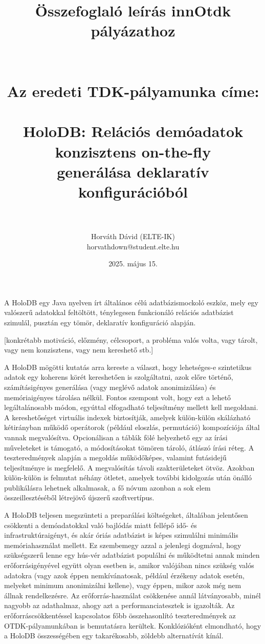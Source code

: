 \documentclass[12pt]{article}
\title{Összefoglaló leírás innOtdk pályázathoz \\ ~ \\ ~ \\ {\Large Az eredeti TDK-pályamunka címe: \\ ~ \\ HoloDB: Relációs demóadatok konzisztens on-the-fly \\ generálása deklaratív konfigurációból} \\ ~}
\author{Horváth Dávid (ELTE-IK) \\ horvathdown@student.elte.hu}
\date{2025. május 15.}
\begin{document}
\begin{titlepage}
\maketitle
\thispagestyle{empty}
\end{titlepage}

\cleardoublepage

A HoloDB egy Java nyelven írt általános célú adatbázismockoló eszköz, mely egy valószerű adatokkal feltöltött, ténylegesen funkcionáló relációs adatbázist szimulál, pusztán egy tömör, deklaratív konfiguráció alapján.

[konkrétabb motiváció, előzmény, célcsoport, a probléma valós volta, vagy tárolt, vagy nem konzisztens, vagy nem kereshető stb.]

A HoloDB mögötti kutatás arra kereste a választ, hogy lehetséges-e szintetikus adatok egy koherens körét kereshetően is szolgáltatni, azok előre történő, számításigényes generálása (vagy meglévő adatok anonimizálása) és memóriaigényes tárolása nélkül. Fontos szempont volt, hogy ezt a lehető legáltalánosabb módon, egyúttal elfogadható teljesítmény mellett kell megoldani.
A kereshetőséget virtuális indexek biztosítják, amelyek külön-külön skálázható kétirányban működő operátorok (például eloszlás, permutáció) kompozíciója által vannak megvalósítva.
Opcionálisan a táblák fölé helyezhető egy az írási műveleteket is támogató, a módosításokat tömören tároló, átlászó írási réteg.
A teszteredmények alapján a megoldás működőképes, valamint futásidejű teljesítménye is megfelelő.
A megvalósítás távoli szakterületeket ötvöz. Azokban külön-külön is felmutat néhány ötletet, amelyek további kidolgozás után önálló publikálásra lehetnek alkalmasak, a fő nóvum azonban a sok elem összeillesztéséből létrejövő újszerű szoftvertípus.

A HoloDB teljesen megszünteti a preparálási költségeket, általában jelentősen csökkenti a demóadatokkal való bajlódás miatt fellépő idő- és infrastruktúraigényt, és akár óriás adatbázist is képes szimulálni minimális memóriahasználat mellett.
Ez szembemegy azzal a jelenlegi dogmával, hogy szükségszerű lenne egy hús-vér adatbázist populálni és működtetni annak minden erőforrásigényével együtt olyan esetben is, amikor valójában nincs szükség valós adatokra (vagy azok éppen nemkívánatosak, például érzékeny adatok esetén, melyeket minimum anonimizálni kellene),
vagy éppen, mikor azok még nem állnak rendelkezésre.
Az erőforrás-használat csökkenése annál látványosabb, minél nagyobb az adathalmaz, ahogy azt a performanciatesztek is igazolták.
Az erőforráscsökkentéssel kapcsolatos főbb összehasonlító teszteredmények az OTDK-pályamunkában is bemutatásra kerültek.
Konklózióként elmondható, hogy a HoloDB összességében egy takarékosabb, zöldebb alternatívát kínál.
\end{document}
